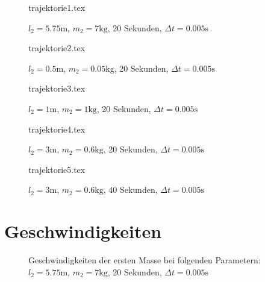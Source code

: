 \documentclass[12pt,a4paper,titlepage,headinclude,bibtotoc]{scrartcl}
\begin{document}
\begin{figure}[!htb]
	\centering
	{trajektorie1.tex}
	\caption{$l_2=5.75\si{\meter}$, $m_2=7\si{\kilo\gram}$, 20 Sekunden, $\Delta t = 0.005 \si{\second}$}
\end{figure}

\begin{figure}[!htb]
	\centering
	{trajektorie2.tex}
	\caption{$l_2=0.5\si{\meter}$, $m_2=0.05\si{\kilo\gram}$, 20 Sekunden, $\Delta t = 0.005 \si{\second}$}
\end{figure}

\begin{figure}[!htb]
	\centering
	{trajektorie3.tex}
	\caption{$l_2=1\si{\meter}$, $m_2=1\si{\kilo\gram}$, 20 Sekunden, $\Delta t = 0.005 \si{\second}$}
\end{figure}

\begin{figure}[!htb]
	\centering
	{trajektorie4.tex}
	\caption{$l_2=3\si{\meter}$, $m_2=0.6\si{\kilo\gram}$, 20 Sekunden, $\Delta t = 0.005 \si{\second}$}
\end{figure}

\begin{figure}[!htb]
	\centering
	{trajektorie5.tex}
	\caption{$l_2=3\si{\meter}$, $m_2=0.6\si{\kilo\gram}$, 40 Sekunden, $\Delta t = 0.005 \si{\second}$}
\end{figure}


\section{Geschwindigkeiten}
\begin{figure}
	\centering
	  \hfill
	  \hfill
	  \hfill
  
  \caption{Geschwindigkeiten der ersten Masse bei folgenden Parametern:\\ $l_2=5.75\si{\meter}$, $m_2=7\si{\kilo\gram}$, 20 Sekunden, $\Delta t = 0.005 \si{\second}$}
  \label{fig:geschw11}
\end{figure}
\end{document}
